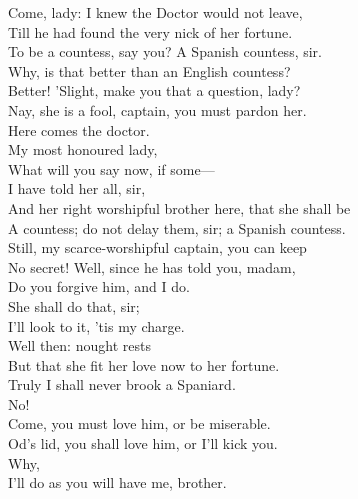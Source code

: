 \documentclass[a4paper,oneside,12pt]{memoir}
\begin{document}
\begin{drama*}
\facespeaks Come, lady: I knew the Doctor would not leave,\\
Till he had found the very nick of her fortune.\\
\kastrilspeaks To be a countess, say you?
\facespeaks {} A Spanish countess, sir.\\
\pliantspeaks Why, is that better than an English countess?\\
\facespeaks Better! 'Slight, make you that a question, lady?\\
\kastrilspeaks Nay, she is a fool, captain, you must pardon her.\\
\facespeaks Here comes the doctor.\\
\subtlespeaks {} My most honoured lady,\\
What will you say now, if some---\\
\facespeaks {} I have told her all, sir,\\
And her right worshipful brother here, that she shall be\\
A countess; do not delay them, sir; a Spanish countess.\\
\subtlespeaks Still, my scarce-worshipful captain, you can keep\\
No secret! Well, since he has told you, madam,\\
Do you forgive him, and I do.\\
\kastrilspeaks {} She shall do that, sir;\\
I'll look to it, 'tis my charge.\\
\subtlespeaks {} Well then: nought rests\\
But that she fit her love now to her fortune.\\
\pliantspeaks Truly I shall never brook a Spaniard.\\
\subtlespeaks {} No!\\
Come, you must love him, or be miserable.\\
\kastrilspeaks Od's lid, you shall love him, or I'll kick you.\\
\pliantspeaks {} Why,\\
I'll do as you will have me, brother.\\

\end{drama*}
\end{document}
